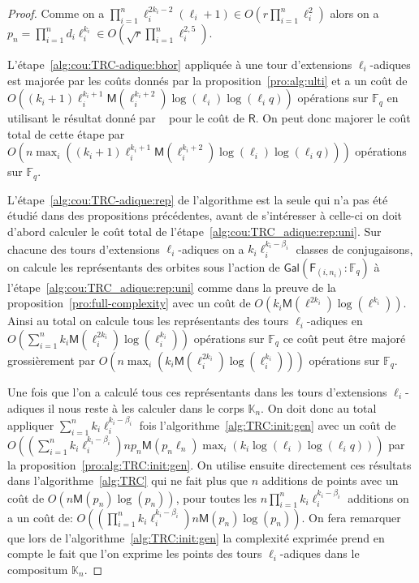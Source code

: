 \documentclass[10pt,a4paper]{book}
\theoremstyle{plain}
\theoremstyle{definition}
\theoremstyle{definition}
\theoremstyle{definition}
\theoremstyle{definition}
\theoremstyle{remark}
\theoremstyle{remark}
\theoremstyle{definition}
\begin{document}
\begin{proof}
Comme on a $\prod_{i=1}^n\ell_{i}^{2k_{i}-2}(\ell_{i}+1) \in O(r \prod_{i=1}^{n}\ell_i^{2} )$ 
alors on a $p_n=\prod_{i=1}^nd_i\ell_i^{k_i} \in O(\sqrt{r}\prod_{i=1}^{n}\ell_i^{2,5})$. 

L'étape~\ref{alg:cou:TRC-adique:bhor} appliquée à une tour d'extensions 
$\ell_i$-adiques est majorée par les coûts donnés par la 
proposition~\ref{pro:alg:ulti} et 
a un coût de 
$O((k_i+1)\ell_i^{k_i+1}\mathsf{M}(\ell_i^{k_i+2})\log(\ell_i)\log(\ell_iq))$ 
opérations sur $\mathbb{F}_q$ en utilisant le  résultat  donné par 
~\cite[Chapter~14.5]{vzGJG03} pour le coût de $\mathsf{R}$.
On peut donc majorer le coût total de cette étape par 
$O(n\max_i((k_i+1)\ell_i^{k_i+1}\mathsf{M}(\ell_i^{k_i+2})\log(\ell_i)\log(\ell_iq)))$
opérations sur $\mathbb{F}_q$.

L'étape~\ref{alg:cou:TRC-adique:rep} de l'algorithme est la seule qui n'a pas été 
étudié dans des propositions précédentes, avant de s'intéresser à celle-ci on 
doit d'abord calculer le coût total de l'étape~\ref{alg:cou:TRC_adique:rep:uni}. 
Sur chacune des tours d'extensions $\ell_i$-adiques 
on a $k_i\ell_i^{k_i-\beta_i}$ classes de conjugaisons, on calcule les 
représentants des orbites sous l'action de $\mathsf{Gal}(\mathsf{F}_{(i,n_i)}:
\mathbb{F}_q)$ à l'étape~\ref{alg:cou:TRC_adique:rep:uni} comme dans la preuve 
de la proposition~\ref{pro:full-complexity} 
avec un coût de $O(k_i\mathsf{M}(\ell^{2k_i})\log(\ell^{k_i}))$.
Ainsi au total on calcule tous les représentants des tours $\ell_i$-adiques en
$O(\sum_{i=1}^nk_i\mathsf{M}(\ell_i^{2k_i})\log(\ell_i^{k_i}))$ opérations sur 
$\mathbb{F}_q$ ce coût peut être majoré grossièrement par 
$O(n\max_i(k_i\mathsf{M}(\ell_i^{2k_i})\log(\ell_i^{k_i})))$ opérations sur 
$\mathbb{F}_q$.

Une fois que l'on a calculé tous ces représentants dans les tours d'extensions
$\ell_i$-adiques il nous reste à les calculer dans le corps $\mathbb{K}_n$.
On doit donc au total appliquer $\sum_{i=1}^n k_i\ell_i^{k_i-\beta_i}$ fois 
l'algorithme~\ref{alg:TRC:init:gen} avec un coût de 
$O((\sum_{i=1}^n k_i\ell_i^{k_i-\beta_i})n p_{n}\mathsf{M}(p_{n}\ell_{n})\max_i(k_i\log(\ell_{i})\log(\ell_{i}q)))$  
par la proposition~\ref{pro:alg:TRC:init:gen}. 
On utilise ensuite directement ces résultats dans l'algorithme~\ref{alg:TRC}
qui ne fait plus que $n$ additions de points avec un coût de 
$O(n\mathsf{M}(p_n)\log(p_n))$, pour toutes les 
$n\prod_{i=1}^nk_i\ell_i^{k_i-\beta_i}$ additions on a un coût de: 
$O((\prod_{i=1}^nk_i\ell_i^{k_i-\beta_i})n\mathsf{M}(p_n)\log(p_n))$.
On fera remarquer que lors de l'algorithme~\ref{alg:TRC:init:gen} la complexité
exprimée prend en compte le fait que l'on exprime les points des tours 
$\ell_i$-adiques dans le compositum $\mathbb{K}_n$.


\end{proof}
\end{document}
